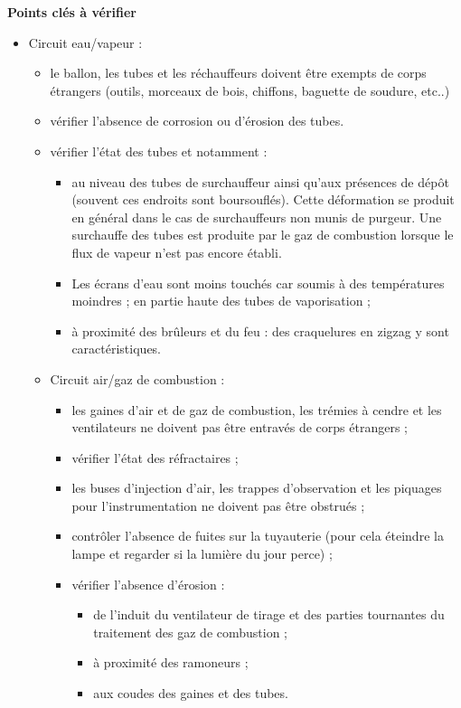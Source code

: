 \textbf{Points clés à vérifier}

\begin{itemize}
    \item Circuit eau/vapeur : 
        \begin{itemize}
            \item le ballon, les tubes et les réchauffeurs doivent être exempts de corps étrangers (outils, morceaux de bois, chiffons, baguette de soudure, etc..)

            \item vérifier l’absence de corrosion ou d’érosion des tubes.
            \item vérifier l’état des tubes et notamment :
            \begin{itemize}
                \item au niveau des tubes de surchauffeur ainsi qu’aux présences de dépôt (souvent ces endroits sont boursouflés). Cette déformation se produit en général dans le cas de surchauffeurs non munis de purgeur. Une surchauffe des tubes est produite par le gaz de combustion lorsque le flux de vapeur n’est pas encore établi. \item Les écrans d’eau sont moins touchés car soumis à des températures moindres ;
                en partie haute des tubes de vaporisation ;
                \item à proximité des brûleurs et du feu : des craquelures en zigzag y sont caractéristiques.
        \end{itemize}

    \item Circuit air/gaz de combustion : 
        \begin{itemize}
            \item les gaines d’air et de gaz de combustion, les trémies à cendre et les ventilateurs ne doivent pas être entravés de corps étrangers ;
            \item vérifier l’état des réfractaires ;
            \item les buses d’injection d’air, les trappes d’observation et les piquages pour l’instrumentation ne doivent pas être obstrués ;
            \item contrôler l’absence de fuites sur la tuyauterie (pour cela éteindre la lampe et regarder si la lumière du jour perce) ;
            \item vérifier l’absence d’érosion :
                \begin{itemize}
                \item de l’induit du ventilateur de tirage et des parties tournantes du traitement des gaz 
                de combustion ;
                \item à proximité des ramoneurs ;
                \item aux coudes des gaines et des tubes.
                \end{itemize}
            \end{itemize}    
        \end{itemize}
    \end{itemize}

